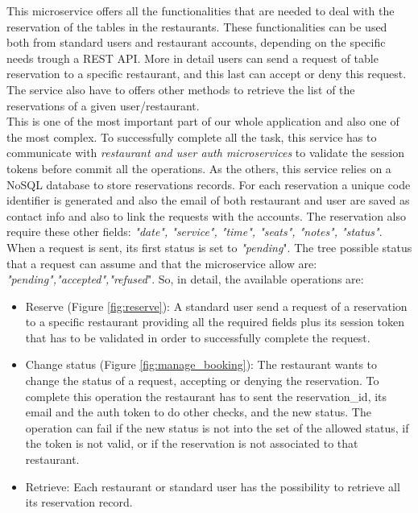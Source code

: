 This microservice offers all the functionalities that are needed to deal with the reservation of the tables in the restaurants. These functionalities can be used both from standard users and restaurant accounts, depending on the specific needs trough a REST API. More in detail users can send a request of table reservation to a specific restaurant, and this last can accept or deny this request. The service also have to offers other methods to retrieve the list of the reservations of a given user/restaurant. \\
This is one of the most important part of our whole application and also one of the most complex. To successfully complete all the task, this service has to communicate with \textit{ restaurant and user auth microservices } to validate the session tokens before commit all the operations.
As the others, this service relies on a NoSQL database to store reservations records. For each reservation a unique code identifier is generated and also the email of both restaurant and user are saved as contact info and also to link the requests with the accounts. The reservation also require these other fields: \textit{"date", "service", "time", "seats", "notes", "status"}. When a request is sent, its first status is set to \textit{"pending}". The tree possible status that a request can assume and that the microservice allow are: \textit{"pending","accepted","refused}".
So, in detail, the available operations are:

\begin{itemize}
    \item Reserve (Figure \ref{fig:reserve}): A standard user  send a request of a reservation to a specific restaurant providing all the required fields plus its session token that has to be validated in order to successfully complete the request. 
    \item Change status  (Figure \ref{fig:manage_booking}): The restaurant wants to change the status of a request, accepting or denying the reservation. To complete this operation the restaurant has to sent the reservation\_id, its email and the auth token to do other checks, and the new status. The operation can fail if the new status is not into the set of the allowed status, if the token is not valid, or if the reservation is not associated to that restaurant.
    \item Retrieve: Each restaurant or standard user has the possibility to retrieve all its reservation record.
    
\end{itemize}


